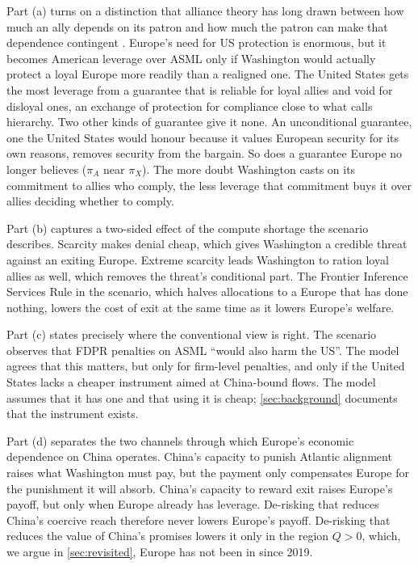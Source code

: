 Part (a) turns on a distinction that alliance theory has long drawn between how much an ally depends on its patron and how much the patron can make that dependence contingent \citep{snyder1984security, morrow1991alliances, benson2012constructing}. Europe's need for US protection is enormous, but it becomes American leverage over ASML only if Washington would actually protect a loyal Europe more readily than a realigned one. The United States gets the most leverage from a guarantee that is reliable for loyal allies and void for disloyal ones, an exchange of protection for compliance close to what \citet{lake2009hierarchy} calls hierarchy. Two other kinds of guarantee give it none. An unconditional guarantee, one the United States would honour because it values European security for its own reasons, removes security from the bargain. So does a guarantee Europe no longer believes ($\pi_A$ near $\pi_X$). The more doubt Washington casts on its commitment to allies who comply, the less leverage that commitment buys it over allies deciding whether to comply.

Part (b) captures a two-sided effect of the compute shortage the scenario describes. Scarcity makes denial cheap, which gives Washington a credible threat against an exiting Europe. Extreme scarcity leads Washington to ration loyal allies as well, which removes the threat's conditional part. The Frontier Inference Services Rule in the scenario, which halves allocations to a Europe that has done nothing, lowers the cost of exit at the same time as it lowers Europe's welfare.

Part (c) states precisely where the conventional view is right. The scenario observes that FDPR penalties on ASML ``would also harm the US''. The model agrees that this matters, but only for firm-level penalties, and only if the United States lacks a cheaper instrument aimed at China-bound flows. The model assumes that it has one and that using it is cheap; \cref{sec:background} documents that the instrument exists.

Part (d) separates the two channels through which Europe's economic dependence on China operates. China's capacity to punish Atlantic alignment raises what Washington must pay, but the payment only compensates Europe for the punishment it will absorb. China's capacity to reward exit raises Europe's payoff, but only when Europe already has leverage. De-risking that reduces China's coercive reach therefore never lowers Europe's payoff. De-risking that reduces the value of China's promises lowers it only in the region $Q>0$, which, we argue in \cref{sec:revisited}, Europe has not been in since 2019.
